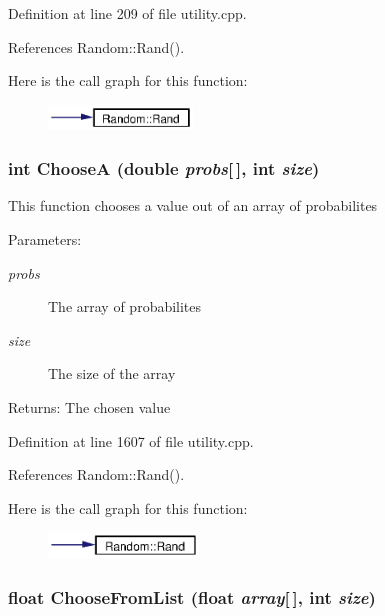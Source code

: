 Definition at line 209 of file utility.cpp.

References Random::Rand().

Here is the call graph for this function:\begin{figure}[H]
\begin{center}
\leavevmode
\includegraphics[width=109pt]{utility_8cpp_a6_cgraph}
\end{center}
\end{figure}
\subsubsection{\setlength{\rightskip}{0pt plus 5cm}int Choose\-A (double {\em probs}[$\,$], int {\em size})}\label{utility_8cpp_a27}


This function chooses a value out of an array of probabilites \begin{Desc}
\item[Parameters:]
\begin{description}
\item[{\em probs}]The array of probabilites \item[{\em size}]The size of the array \end{description}
\end{Desc}
\begin{Desc}
\item[Returns:]The chosen value \end{Desc}


Definition at line 1607 of file utility.cpp.

References Random::Rand().

Here is the call graph for this function:\begin{figure}[H]
\begin{center}
\leavevmode
\includegraphics[width=113pt]{utility_8cpp_a27_cgraph}
\end{center}
\end{figure}
\subsubsection{\setlength{\rightskip}{0pt plus 5cm}float Choose\-From\-List (float {\em array}[$\,$], int {\em size})}\label{utility_8cpp_a28}


